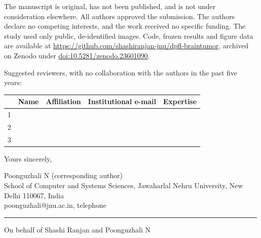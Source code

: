 \documentclass[11pt,a4paper]{article}
\begin{document}
The manuscript is original, has not been published, and is not under consideration elsewhere. All authors approved
the submission. The authors declare no competing interests, and the work received no specific funding. The study used
only public, de-identified images. Code, frozen results and figure data are available at
\url{https://github.com/shashiranjan-jnu/dpfl-braintumor}, archived on Zenodo under \href{https://doi.org/10.5281/zenodo.23601090}{doi:10.5281/zenodo.23601090}.

Suggested reviewers, with no collaboration with the authors in the past five years:

{\small
\renewcommand{\arraystretch}{1.6}
\begin{tabular}{@{}p{0.2cm}p{3.6cm}p{5.0cm}p{4.6cm}p{3.0cm}@{}}
 & \textbf{Name} & \textbf{Affiliation} & \textbf{Institutional e-mail} & \textbf{Expertise}\\\hline
1 & & & & \\\hline
2 & & & & \\\hline
3 & & & & \\\hline
\end{tabular}}

Yours sincerely,

Poonguzhali N (corresponding author)\\
School of Computer and Systems Sciences, Jawaharlal Nehru University, New Delhi 110067, India\\
poonguzhali@jnu.ac.in, telephone \rule{4cm}{0.4pt}

On behalf of Shashi Ranjan and Poonguzhali N
\end{document}
